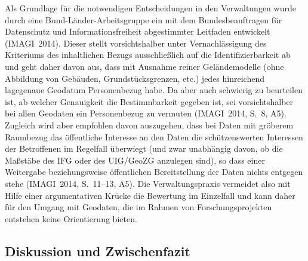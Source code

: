 \documentclass[a4paper,
fontsize=11pt,
oneside,
numbers=noperiodatend,
parskip=half-,
bibliography=totoc,
final
]{scrartcl}
\begin{document}
Als Grundlage für die notwendigen Entscheidungen in den Verwaltungen
wurde durch eine Bund-Länder-Arbeitsgruppe ein mit dem Bundesbeauftragen
für Datenschutz und Informationsfreiheit abgestimmter Leitfaden
entwickelt (IMAGI~2014). Dieser stellt vorsichtshalber unter
Vernachlässigung des Kriteriums des inhaltlichen Bezugs ausschließlich
auf die Identifizierbarkeit ab und geht daher davon aus, dass mit
Ausnahme reiner Geländemodelle (ohne Abbildung von Gebäuden,
Grundstücksgrenzen, etc.) jedes hinreichend lagegenaue Geodatum
Personenbezug habe. Da aber auch schwierig zu beurteilen ist, ab welcher
Genauigkeit die Bestimmbarkeit gegeben ist, sei vorsichtshalber bei
allen Geodaten ein Personenbezug zu vermuten (IMAGI~2014, S.~8, A5).
Zugleich wird aber empfohlen davon auszugehen, dass bei Daten mit
gröberem Raumbezug das öffentliche Interesse an den Daten die
schützenswerten Interessen der Betroffenen im Regelfall überwiegt (und
zwar unabhängig davon, ob die Maßstäbe des IFG oder des UIG/GeoZG
anzulegen sind), so dass einer Weitergabe beziehungsweise öffentlichen
Bereitstellung der Daten nichts entgegen stehe (IMAGI~2014, S.~11--13,
A5). Die Verwaltungspraxis vermeidet also mit Hilfe einer argumentativen
Krücke die Bewertung im Einzelfall und kann daher für den Umgang mit
Geodaten, die im Rahmen von Forschungsprojekten entstehen keine
Orientierung bieten.

\hypertarget{diskussion-und-zwischenfazit}{%
\subsection{Diskussion und
Zwischenfazit}\label{diskussion-und-zwischenfazit}}
\end{document}
